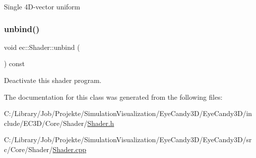 Single 4\+D-\/vector uniform \mbox{\label{classec_1_1_shader_a4d3730787deb6b28d59fc8b6486e5cb3}} 
\subsubsection{\texorpdfstring{unbind()}{unbind()}}
{\footnotesize\ttfamily void ec\+::\+Shader\+::unbind (\begin{DoxyParamCaption}{ }\end{DoxyParamCaption}) const}

Deactivate this shader program. 

The documentation for this class was generated from the following files\+:\begin{DoxyCompactItemize}
\item 
C\+:/\+Library/\+Job/\+Projekte/\+Simulation\+Visualization/\+Eye\+Candy3\+D/\+Eye\+Candy3\+D/include/\+E\+C3\+D/\+Core/\+Shader/\mbox{\hyperlink{_shader_8h}{Shader.\+h}}\item 
C\+:/\+Library/\+Job/\+Projekte/\+Simulation\+Visualization/\+Eye\+Candy3\+D/\+Eye\+Candy3\+D/src/\+Core/\+Shader/\mbox{\hyperlink{_shader_8cpp}{Shader.\+cpp}}\end{DoxyCompactItemize}
